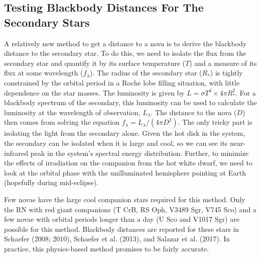 \documentclass[a4paper,fleqn,usenatbib]{mnras}
\begin{document}
\subsection{Testing Blackbody Distances For The Secondary Stars}

A relatively new method to get a distance to a nova is to derive the blackbody distance to the secondary star.  To do this, we need to isolate the flux from the secondary star and quantify it by its surface temperature ($T$) and a measure of its flux at some wavelength ($f_{\lambda}$).  The radius of the secondary star ($R_*$) is tightly constrained by the orbital period in a Roche lobe filling situation, with little dependence on the star masses.  The luminosity is given by $L=\sigma T^4 \times 4\pi R_*^2$.  For a blackbody spectrum of the secondary, this luminosity can be used to calculate the luminosity at the wavelength of observation, $L_{\lambda}$.  The distance to the nova ($D$) then comes from solving the equation $f_{\lambda}=L_{\lambda}/(4 \pi D^2)$.  The only tricky part is isolating the light from the secondary alone.  Given the hot disk in the system, the secondary can be isolated when it is large and cool, so we can see its near-infrared peak in the system's spectral energy distribution.  Further, to minimize the effects of irradiation on the companion from the hot white dwarf, we need to look at the orbital phase with the unilluminated hemisphere pointing at Earth (hopefully during mid-eclipse).

Few novae have the large cool companion stars required for this method.  Only the RN with red giant companions (T CrB, RS Oph, V3489 Sgr, V745 Sco) and a few novae with orbital periods longer than a day (U Sco and V1017 Sgr) are possible for this method.  Blackbody distances are reported for these stars in Schaefer (2008; 2010), Schaefer et al. (2013), and Salazar et al. (2017).  In practice, this physics-based method promises to be fairly accurate.
\end{document}

